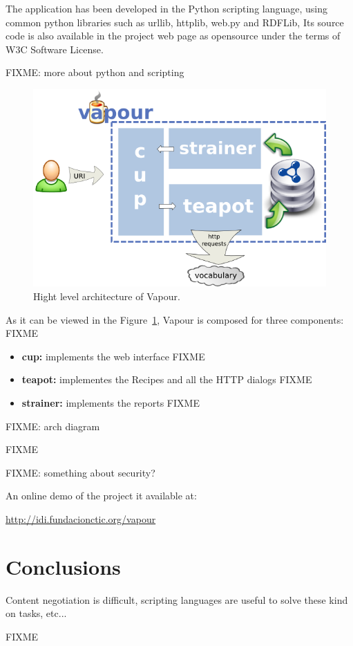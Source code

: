 The application has been developed in the Python scripting language, using common
python libraries such as urllib, httplib, web.py and RDFLib, Its source code is 
also available in the project web page as opensource under the terms of W3C Software 
License.

FIXME: more about python and scripting

\begin{figure}
 \centering
 \includegraphics[width=12cm]{images/arch.png}
 \caption{\label{fig:arch}Hight level architecture of Vapour.}
\end{figure}

As it can be viewed in the Figure~\ref{fig:arch}, Vapour is composed for three 
components: FIXME

\begin{itemize}

  \item \textbf{cup:} implements the web interface FIXME

  \item \textbf{teapot:} implementes the Recipes and all the HTTP dialogs FIXME

  \item \textbf{strainer:} implements the reports FIXME

\end{itemize}

FIXME: arch diagram

FIXME

FIXME: something about security?

An online demo of the project it available at: 
\begin{center}\url{http://idi.fundacionctic.org/vapour}\end{center}

\section{Conclusions}

Content negotiation is difficult, scripting languages are useful to solve these kind on tasks, etc...

FIXME

